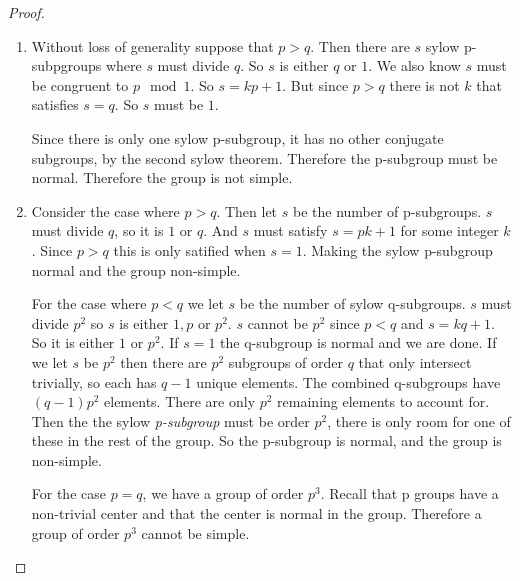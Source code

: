 \documentclass[12pt]{article}
\begin{document}
\begin{proof}

    \begin{enumerate}
        \item Without loss of generality suppose that $p > q$. Then
            there are $s$ sylow p-subpgroups where $s$ must divide $q$.
            So $s$ is either $q$ or $1$. We also know $s$ must be
            congruent to $p \mod 1$. So $s = kp + 1$. But since $p > q$
            there is not $k$ that satisfies $s = q$. So $s$ must be $1$. 

            Since there is only one sylow p-subgroup, it has no other
            conjugate subgroups, by the second sylow theorem. Therefore
            the p-subgroup must be normal. Therefore the group is not
            simple.

        \item Consider the case where $p > q$. Then let $s$ be the
            number of p-subgroups. $s$ must divide $q$, so it is $1$ or
            $q$. And $s$ must satisfy $s =
            pk + 1$ for some integer $k$. Since $p > q$ this is only
            satified when $s = 1$. Making the sylow p-subgroup normal
            and the group non-simple.

            For the case where $p < q$ we let $s$ be the number of sylow
            q-subgroups. $s$ must divide $p^2$ so $s$ is either $1, p$
            or $p^2$. $s$ cannot be $p^2$ since $p < q$ and $s = kq +
            1$. So it is either $1$ or $p^2$. If $s = 1$ the q-subgroup
            is normal and we are done. If we let $s$ be $p^2$ then there
            are $p^2$ subgroups of order $q$ that only intersect
            trivially, so each has $q-1$ unique elements. The combined
            q-subgroups have $(q-1)p^2$ elements. There are only $p^2$
            remaining elements to account for. Then the the sylow
            \textit{p-subgroup} must be order $p^2$, there is only room
            for one of these in the rest of the group. So the p-subgroup
            is normal, and the group is non-simple.

            For the case $p = q$, we have a group of order $p^3$. Recall
            that p groups have a non-trivial center and that the center
            is normal in the group. Therefore a group of order $p^3$
            cannot be simple.

    \end{enumerate}

\end{proof}
\end{document}
